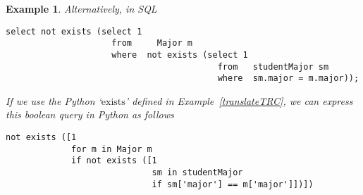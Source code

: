 \documentclass{article}
\newtheorem{example}{Example}
\begin{document}
\begin{example}
Alternatively, in SQL
\begin{verbatim}
select not exists (select 1
      	      	     from	  Major	m
      	      	     where  not exists (select 1
      	      	      	      	          from   studentMajor sm
      	      	      	      	          where  sm.major = m.major));
\end{verbatim}

If we use the Python `$\text{exists}$' defined in Example~\ref{translateTRC}, we
can express this boolean query in Python as follows

\begin{verbatim}
not exists ([1
      	     for m in Major	m
      	     if not exists ([1
      	      	      	     sm in studentMajor
      	      	      	     if sm['major'] == m['major']])])
\end{verbatim}


\end{example}
\end{document}
